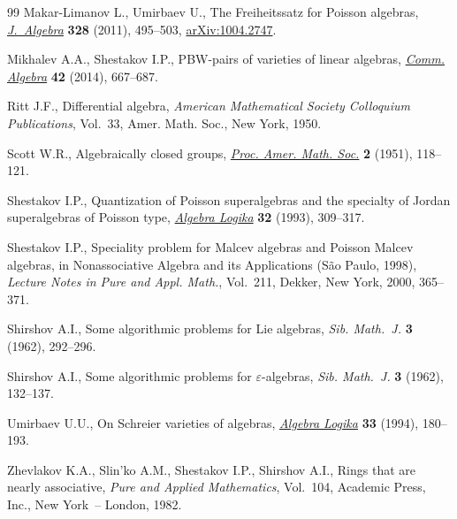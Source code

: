 \documentclass[11pt]{article}
\begin{document}
\begin{thebibliography}{99}
Makar-Limanov L., Umirbaev U., The {F}reiheitssatz for {P}oisson algebras,
  \href{http://dx.doi.org/10.1016/j.jalgebra.2010.08.015}{\textit{J.~Algebra}} \textbf{328} (2011), 495--503, \href{http://arxiv.org/abs/1004.2747}{arXiv:1004.2747}.

Mikhalev A.A., Shestakov I.P., P{BW}-pairs of varieties of linear algebras,
  \href{http://dx.doi.org/10.1080/00927872.2012.720867}{\textit{Comm. Algebra}} \textbf{42} (2014), 667--687.

Ritt J.F., Dif\/ferential algebra, \textit{American Mathematical Society
  Colloquium Publications}, Vol.~33, Amer. Math. Soc., New York, 1950.

Scott W.R., Algebraically closed groups, \href{http://dx.doi.org/10.1090/S0002-9939-1951-0040299-6}{\textit{Proc. Amer. Math. Soc.}}
  \textbf{2} (1951), 118--121.

Shestakov I.P., Quantization of {P}oisson superalgebras and the specialty of
  {J}ordan superalgebras of {P}oisson type, \href{http://dx.doi.org/10.1007/BF02261711}{\textit{Algebra Logika}} \textbf{32}
  (1993), 309--317.

Shestakov I.P.,
Speciality problem for Malcev algebras and Poisson Malcev algebras,
in Nonassociative Algebra and its Applications (S\~ao Paulo, 1998),
\textit{Lecture Notes in Pure and Appl. Math.},
Vol.~211, Dekker, New York, 2000,
365--371.

Shirshov A.I., Some algorithmic problems for Lie algebras, \textit{Sib.
  Math.~J.} \textbf{3} (1962), 292--296.

Shirshov A.I., Some algorithmic problems for {$\varepsilon $}-algebras,
  \textit{Sib. Math.~J.} \textbf{3} (1962), 132--137.

Umirbaev U.U., On {S}chreier varieties of algebras, \href{http://dx.doi.org/10.1007/BF00750233}{\textit{Algebra Logika}}
  \textbf{33} (1994), 180--193.

Zhevlakov K.A., Slin'ko A.M., Shestakov I.P., Shirshov A.I., Rings that are
  nearly associative, \textit{Pure and Applied Mathematics}, Vol.~104, Academic
  Press, Inc., New York~-- London, 1982.

\end{thebibliography}
\end{document}
